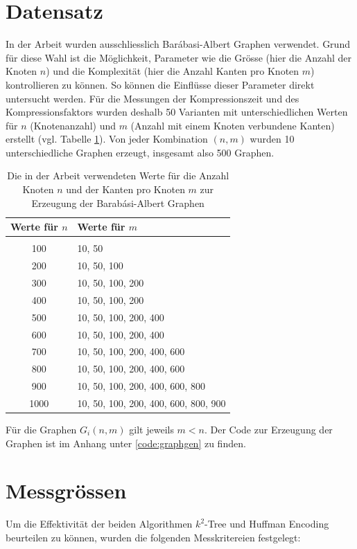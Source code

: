 \documentclass{ffhsthesis}
\begin{document}
\section{Datensatz}
\label{ch:datensatz}
In der Arbeit wurden ausschliesslich Barábasi-Albert Graphen verwendet. Grund für diese Wahl ist die Möglichkeit, Parameter wie die Grösse (hier die Anzahl der Knoten $n$) und die Komplexität (hier die Anzahl Kanten pro Knoten $m$) kontrollieren zu können. So können die Einflüsse dieser Parameter direkt untersucht werden. Für die Messungen der Kompressionszeit und des Kompressionsfaktors wurden deshalb 50 Varianten mit unterschiedlichen Werten für $n$ (Knotenanzahl) und $m$ (Anzahl mit einem Knoten verbundene Kanten) erstellt (vgl. Tabelle \ref{tab:datensatz}). Von jeder Kombination $(n,m)$ wurden 10 unterschiedliche Graphen erzeugt, insgesamt also 500 Graphen. 
\begin{table}[h]
    \centering
    \begin{tabular}{c|l}\toprule
        Werte für $n$ & Werte für $m$ \\
        \hline \\
        100 & 10, 50 \\
        200 & 10, 50, 100 \\
        300 & 10, 50, 100, 200 \\
        400 & 10, 50, 100, 200 \\
        500 & 10, 50, 100, 200, 400 \\
        600 & 10, 50, 100, 200, 400 \\
        700 & 10, 50, 100, 200, 400, 600 \\
        800 & 10, 50, 100, 200, 400, 600 \\
        900 & 10, 50, 100, 200, 400, 600, 800 \\
        1000 & 10, 50, 100, 200, 400, 600, 800, 900 \\ \bottomrule
    \end{tabular}
    \caption{Die in der Arbeit verwendeten Werte für die Anzahl Knoten $n$ und der Kanten pro Knoten $m$ zur Erzeugung der Barabási-Albert Graphen}
    \label{tab:datensatz}
\end{table}
Für die Graphen $G_{i}(n,m)$ gilt jeweils $m < n$. Der Code zur Erzeugung der Graphen ist im Anhang unter \ref{code:graphgen} zu finden.
\section{Messgrössen}
Um die Effektivität der beiden Algorithmen $k^2$-Tree und Huffman Encoding beurteilen zu können, wurden die folgenden Messkritereien festgelegt:
\end{document}
